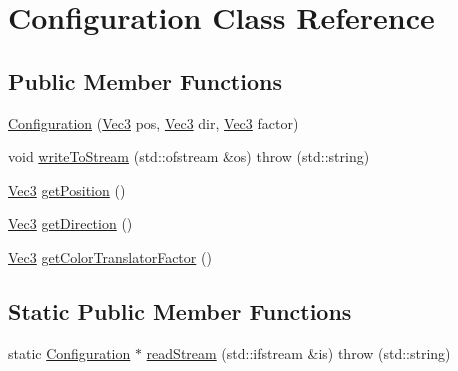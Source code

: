 \hypertarget{classConfiguration}{
\section{Configuration Class Reference}
\label{classConfiguration}
}
\subsection*{Public Member Functions}
\begin{DoxyCompactItemize}
\item 
\hyperlink{classConfiguration_ab4fd03a275c2798ada0ef743239acf74}{Configuration} (\hyperlink{structVec3}{Vec3} pos, \hyperlink{structVec3}{Vec3} dir, \hyperlink{structVec3}{Vec3} factor)
\item 
void \hyperlink{classConfiguration_a9403336ba10e6d0338677be02822c508}{writeToStream} (std::ofstream \&os)  throw (std::string)
\item 
\hyperlink{structVec3}{Vec3} \hyperlink{classConfiguration_a3d0f2eb397a5d451b4afd9aecee882f2}{getPosition} ()
\item 
\hyperlink{structVec3}{Vec3} \hyperlink{classConfiguration_adfccc165f66c49cecc60435a1a2141e4}{getDirection} ()
\item 
\hyperlink{structVec3}{Vec3} \hyperlink{classConfiguration_a1713110217c444ff49e3cd009bae0f4e}{getColorTranslatorFactor} ()
\end{DoxyCompactItemize}
\subsection*{Static Public Member Functions}
\begin{DoxyCompactItemize}
\item 
static \hyperlink{classConfiguration}{Configuration} $\ast$ \hyperlink{classConfiguration_a468ed129dfc345b7641e05572698952b}{readStream} (std::ifstream \&is)  throw (std::string)
\end{DoxyCompactItemize}



